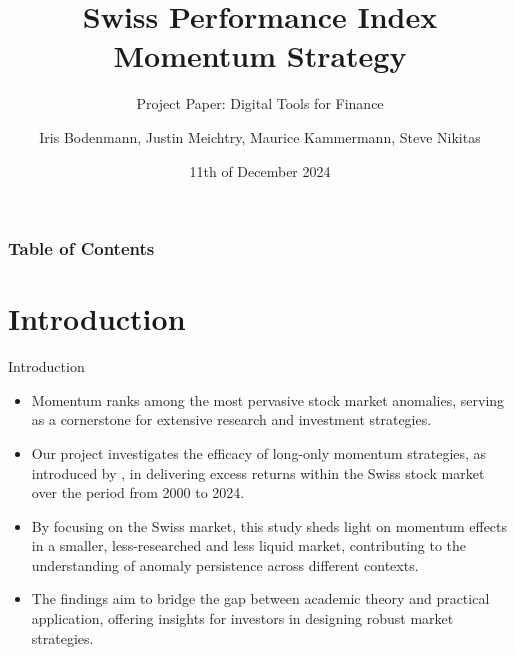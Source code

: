 \documentclass[10pt]{beamer}
\title{Swiss Performance Index Momentum Strategy}
\subtitle{Project Paper: Digital Tools for Finance}
\author{Iris Bodenmann, Justin Meichtry, Maurice Kammermann, Steve Nikitas}
\date{11th of December 2024}
\institute[]{Igor Pozdeev\\Department of Finance\\ University of Zurich}
\begin{document}
\begin{frame}
\maketitle
\end{frame}

\begin{frame}
\frametitle{Table of Contents}
\tableofcontents
\end{frame}

\section{Introduction}
\begin{frame}{Introduction}
\begin{itemize}
    \item Momentum ranks among the most pervasive stock market anomalies, serving as a cornerstone for extensive research and investment strategies.
    \item Our project investigates the efficacy of long-only momentum strategies, as introduced by \cite{jegatit1993}, in delivering excess returns within the Swiss stock market over the period from 2000 to 2024.
    \item By focusing on the Swiss market, this study sheds light on momentum effects in a smaller, less-researched and less liquid market, contributing to the understanding of anomaly persistence across different contexts.
    \item The findings aim to bridge the gap between academic theory and practical application, offering insights for investors in designing robust market strategies.
\end{itemize}
\end{frame}



\end{document}
